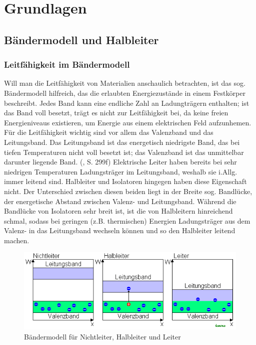 
\chapter{Grundlagen}
\section{Bändermodell und Halbleiter}
\subsection{Leitfähigkeit im Bändermodell}
Will man die Leitfähigkeit von Materialien anschaulich betrachten, ist das sog. Bändermodell hilfreich, das die erlaubten Energiezustände in einem Festkörper beschreibt. Jedes Band kann eine endliche Zahl an Ladungträgern enthalten; ist das Band voll besetzt, trägt es nicht zur Leitfähigkeit bei, da keine freien Energieniveaus existieren, um Energie aus einem elektrischen Feld aufzunhemen. Für die Leitfähigkeit wichtig sind vor allem das Valenzband und das Leitungsband. Das Leitungsband ist das energetisch niedrigste Band, das bei tiefen Temperaturen nicht voll besetzt ist; das Valenzband ist das unmittelbar darunter liegende Band. (\cite{Eichler2001}, S. 299f)
Elektrische Leiter haben bereits bei sehr niedrigen Temperaturen Ladungsträger im Leitungsband, weshalb sie i.Allg. immer leitend sind. Halbleiter und Isolatoren hingegen haben diese Eigenschaft nicht. Der Unterschied zwischen diesen beiden liegt in der Breite sog. Bandlücke, der energetische Abstand zwischen Valenz- und Leitungsband. Während die Bandlücke von Isolatoren sehr breit ist, ist die von Halbleitern hinreichend schmal, sodass bei geringen (z.B. thermischen) Energien Ladungsträger aus dem Valenz- in das Leitungsband wechseln können und so den Halbleiter leitend machen. \\
\begin{figure}[h]
    \centering
    \includegraphics[scale=0.75]{Bilder/Baendermodell.png}
    \caption{Bändermodell für Nichtleiter, Halbleiter und Leiter \protect \footnotemark}
\end{figure}

